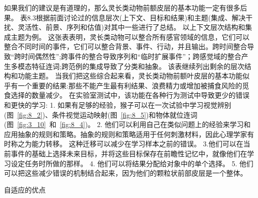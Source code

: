 如果我们的建议是有道理的，那么灵长类动物前额皮层的基本功能一定有很多后果。
表8.3根据前面讨论过的信息层次(上下文、目标和结果)和主题(集成、解决干扰、灵活性、前景、序列和估值)对其中一些进行了总结。
以上下文层次结构和集成主题为例。
这张表表明，灵长类动物可以整合所有感官领域的信息，它们可以整合不同时间的事件，它们可以整合背景、事件、行动，并且输出。跨时间整合导致“跨时间偶然性”;跨事件的整合导致序列和“临时扩展事件”；跨感觉域的整合产生多模态特征连词;跨范例的集成导致了分类和抽象。
该表继续列出剩余的层次结构和功能主题。
当我们把这些综合起来看，灵长类动物前额叶皮层的基本功能似乎有一个重要的结果:那些不能产生最有利结果、浪费精力或增加被捕食风险的觅食选择的数量减少。
在实验室测试中，该功能在各种行为测试中导致更少的错误和更快的学习:
1. 如果有足够的经验，猴子可以在一次试验中学习视觉辨别(图~\ref{fig:8_2})、条件视觉运动映射(图~\ref{fig:8_5})和物体就位连词(图~\ref{fig:3_10}~和~\ref{fig:8_4})。
2. 他们可以利用自己在类似问题上的经验来学习和应用抽象的规则和策略。抽象的规则和策略适用于任何刺激材料，因此心理学家有时称之为能力转移\cite{warren1966reversal}。
这种迁移可以减少在学习样本之前的错误\cite{bussey2001role}。
3.他们可以在当前事件的基础上选择未来目标，并将这些目标保存在前瞻性记忆中，就像他们在学习设定任务时所做的那样\cite{murray2006prospective,wilson2008prefrontal}。
4. 他们可以将结果分配给对象中的单个选择\cite{walton2010separable}。
5. 他们可以把这些减少错误的机制结合起来，因为他们的颗粒状前部皮层是一个整体。



自适应的优点


